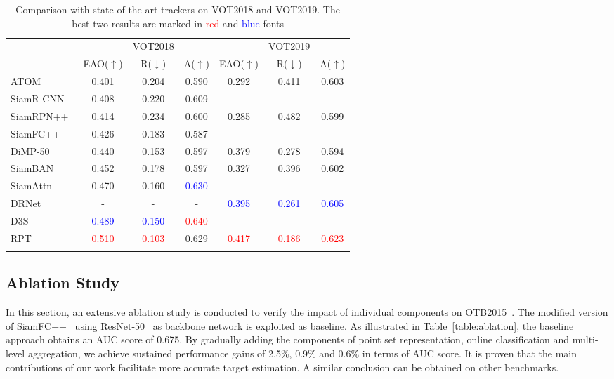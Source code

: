 \documentclass[runningheads]{llncs}
\begin{document}
\begin{table}
\begin{center}
\caption{Comparison with state-of-the-art trackers on VOT2018 and VOT2019. The best two results are marked in \textcolor{red}{red} and \textcolor{blue}{blue} fonts}
\label{table:vot}
\begin{tabular}{@{}l|ccc|ccc@{}}
\hline
&  &VOT2018 & &  &VOT2019 &\tabularnewline
& EAO($\uparrow$) & R($\downarrow$) & A($\uparrow$) & EAO($\uparrow$) & R($\downarrow$) &
A($\uparrow$)\tabularnewline
\hline
ATOM~\cite{atom} & 0.401&0.204 &0.590 &0.292 &0.411&0.603\tabularnewline
SiamR-CNN~\cite{siamrcnn} &0.408 &0.220 &0.609 &- &- &-\tabularnewline
SiamRPN++~\cite{siamrpn++} &0.414 &0.234 &0.600 &0.285 &0.482 &0.599\tabularnewline
SiamFC++~\cite{siamfc++} &0.426 &0.183 &0.587 &- &- &-\tabularnewline
DiMP-50~\cite{dimp} & 0.440&0.153 &0.597 & 0.379&0.278 &0.594\tabularnewline
SiamBAN~\cite{siamban} &0.452 &0.178 &0.597 &0.327 &0.396 &0.602\tabularnewline
SiamAttn~\cite{siamattn} &0.470 &0.160 &\textcolor{blue}{0.630} &- &- &-\tabularnewline
DRNet~\cite{VOT2019}&- &-&-&\textcolor{blue}{0.395}&\textcolor{blue}{0.261}&\textcolor{blue}{0.605}\tabularnewline
D3S~\cite{D3S}&\textcolor{blue}{0.489} &\textcolor{blue}{0.150}&\textcolor{red}{0.640}&-&-&-\tabularnewline
\hline
RPT & \textcolor{red}{0.510}& \textcolor{red}{0.103}&0.629 &\textcolor{red}{0.417} &\textcolor{red}{0.186} &\textcolor{red}{0.623}\tabularnewline
\hline\noalign{\smallskip}
\end{tabular}
\end{center}
\end{table}

\subsection{Ablation Study}\label{header-n50}

In this section, an extensive ablation study is conducted to verify the
impact of individual components on OTB2015~\cite{OTB2015}. The modified version of
SiamFC++~\cite{siamfc++} using ResNet-50~\cite{resnet50} as backbone network is exploited as baseline.
As illustrated in Table~\ref{table:ablation}, the baseline approach obtains an AUC score of
0.675. By gradually adding the components of point set representation,
online classification and multi-level aggregation, we achieve sustained
performance gains of 2.5\%, 0.9\% and 0.6\% in terms of AUC score. It is
proven that the main contributions of our work facilitate more accurate
target estimation. A similar conclusion can be obtained on other
benchmarks.
\end{document}
